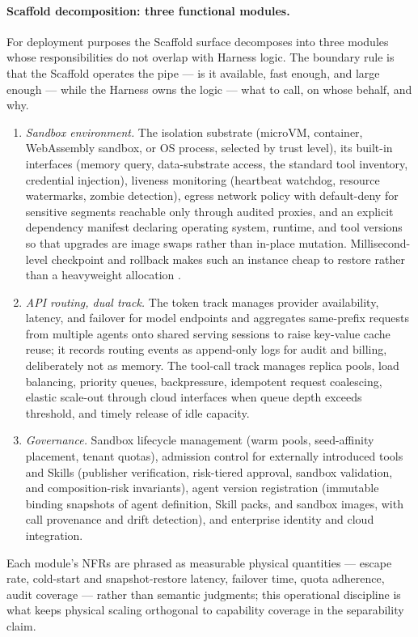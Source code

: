 \documentclass[11pt]{article}
\begin{document}
\paragraph{Scaffold decomposition: three functional modules.}
For deployment purposes the Scaffold surface decomposes into three modules whose responsibilities do not overlap with Harness logic. The boundary rule is that the Scaffold operates the pipe --- is it available, fast enough, and large enough --- while the Harness owns the logic --- what to call, on whose behalf, and why.
\begin{enumerate}
\item \textit{Sandbox environment.} The isolation substrate (microVM, container, WebAssembly sandbox, or OS process, selected by trust level), its built-in interfaces (memory query, data-substrate access, the standard tool inventory, credential injection), liveness monitoring (heartbeat watchdog, resource watermarks, zombie detection), egress network policy with default-deny for sensitive segments reachable only through audited proxies, and an explicit dependency manifest declaring operating system, runtime, and tool versions so that upgrades are image swaps rather than in-place mutation. Millisecond-level checkpoint and rollback makes such an instance cheap to restore rather than a heavyweight allocation \cite{dong2026deltabox}.
\item \textit{API routing, dual track.} The token track manages provider availability, latency, and failover for model endpoints and aggregates same-prefix requests from multiple agents onto shared serving sessions to raise key-value cache reuse; it records routing events as append-only logs for audit and billing, deliberately not as memory. The tool-call track manages replica pools, load balancing, priority queues, backpressure, idempotent request coalescing, elastic scale-out through cloud interfaces when queue depth exceeds threshold, and timely release of idle capacity.
\item \textit{Governance.} Sandbox lifecycle management (warm pools, seed-affinity placement, tenant quotas), admission control for externally introduced tools and Skills (publisher verification, risk-tiered approval, sandbox validation, and composition-risk invariants), agent version registration (immutable binding snapshots of agent definition, Skill packs, and sandbox images, with call provenance and drift detection), and enterprise identity and cloud integration.
\end{enumerate}
Each module's NFRs are phrased as measurable physical quantities --- escape rate, cold-start and snapshot-restore latency, failover time, quota adherence, audit coverage --- rather than semantic judgments; this operational discipline is what keeps physical scaling orthogonal to capability coverage in the separability claim.
\end{document}
